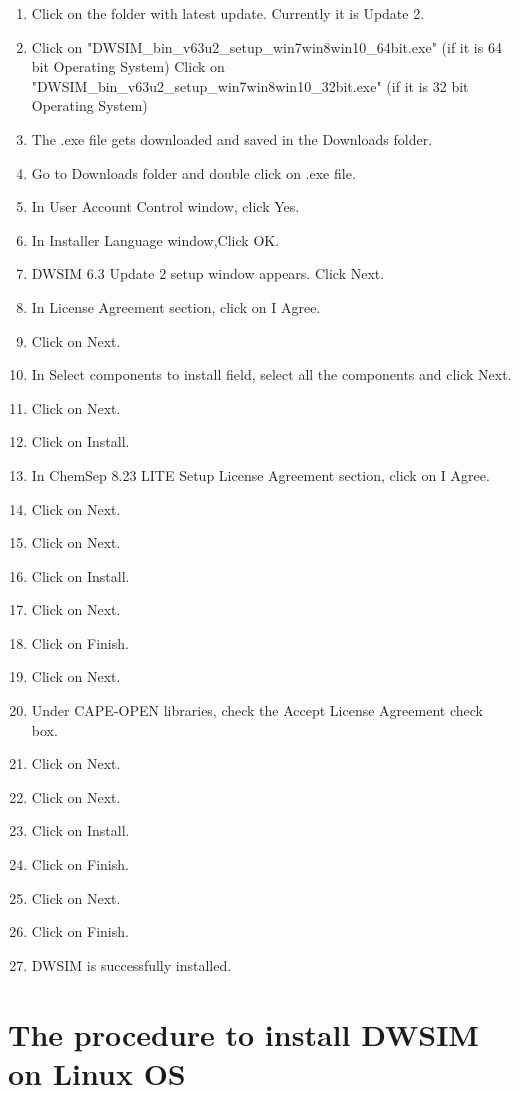 \documentclass[12pt,a4paper]{article}
\begin{document}
\begin{enumerate}
\item Click on the folder with latest update. Currently it is Update 2.
\item Click on "DWSIM\_bin\_v63u2\_setup\_win7win8win10\_64bit.exe" (if it is 64 bit Operating System)
\newline Click on "DWSIM\_bin\_v63u2\_setup\_win7win8win10\_32bit.exe" (if it is 32 bit Operating System)
\item The .exe file gets downloaded and saved in the Downloads folder.
\item Go to Downloads folder and double click on .exe file.
\item In User Account Control window, click Yes.
\item In Installer Language window,Click OK.
\item DWSIM 6.3 Update 2 setup window appears. Click Next.
\item In License Agreement section, click on I Agree.
\item Click on Next.
\item In Select components to install field, select all the components and click Next.
\item Click on Next.
\item Click on Install.
\item In ChemSep 8.23 LITE Setup License Agreement section, click on I Agree.
\item Click on Next.
\item Click on Next.
\item Click on Install.
\item Click on Next.
\newpage
\item Click on Finish.
\item Click on Next.
\item Under CAPE-OPEN libraries, check the Accept License Agreement check box.
\item Click on Next.
\item Click on Next.
\item Click on Install.
\item Click on Finish.
\item Click on Next.
\item Click on Finish.
\item DWSIM is successfully installed.

\end{enumerate}

\section{The procedure to install DWSIM on Linux OS}
\end{document}
